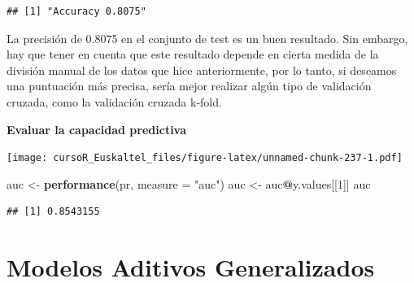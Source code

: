 \documentclass[]{book}
\newenvironment{Shaded}{\begin{snugshade}}{\end{snugshade}}
\newcommand{\KeywordTok}[1]{\textcolor[rgb]{0.13,0.29,0.53}{\textbf{#1}}}
\newcommand{\DataTypeTok}[1]{\textcolor[rgb]{0.13,0.29,0.53}{#1}}
\newcommand{\DecValTok}[1]{\textcolor[rgb]{0.00,0.00,0.81}{#1}}
\newcommand{\StringTok}[1]{\textcolor[rgb]{0.31,0.60,0.02}{#1}}
\newcommand{\OperatorTok}[1]{\textcolor[rgb]{0.81,0.36,0.00}{\textbf{#1}}}
\newcommand{\NormalTok}[1]{#1}
\begin{document}
\begin{verbatim}
## [1] "Accuracy 0.8075"
\end{verbatim}

La precisión de 0.8075 en el conjunto de test es un buen resultado. Sin
embargo, hay que tener en cuenta que este resultado depende en cierta
medida de la división manual de los datos que hice anteriormente, por lo
tanto, si deseamos una puntuación más precisa, sería mejor realizar
algún tipo de validación cruzada, como la validación cruzada k-fold.

\textbf{Evaluar la capacidad predictiva}

\begin{Shaded}
\end{Shaded}

\texttt{[image: cursoR\_Euskaltel\_files/figure-latex/unnamed-chunk-237-1.pdf]}

\begin{Shaded}
\begin{Highlighting}[]
\NormalTok{auc <-}\StringTok{ }\KeywordTok{performance}\NormalTok{(pr, }\DataTypeTok{measure =} \StringTok{"auc"}\NormalTok{)}
\NormalTok{auc <-}\StringTok{ }\NormalTok{auc}\OperatorTok{@}\NormalTok{y.values[[}\DecValTok{1}\NormalTok{]]}
\NormalTok{auc}
\end{Highlighting}
\end{Shaded}

\begin{verbatim}
## [1] 0.8543155
\end{verbatim}

\chapter{Modelos Aditivos
Generalizados}\label{modelos-aditivos-generalizados}
\end{document}
